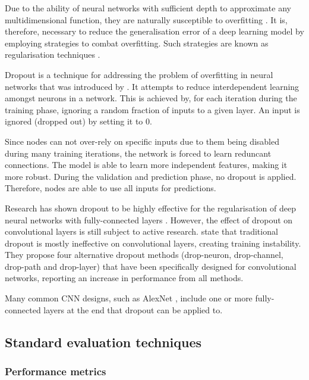 \documentclass{l4proj}
\begin{document}
Due to the ability of neural networks with sufficient depth to approximate any multidimensional function, they are naturally susceptible to overfitting \citep{tetko_neural_1995}. It is, therefore, necessary to reduce the generalisation error of a deep learning model by employing strategies to combat overfitting. Such strategies are known as regularisation techniques \citep{goodfellow_deep_2016}.

Dropout is a technique for addressing the problem of overfitting in neural networks that was introduced by \citet{srivastava_dropout_2014}. It attempts to reduce interdependent learning amongst neurons in a network. This is achieved by, for each iteration during the training phase, ignoring a random fraction of inputs to a given layer. An input is ignored (dropped out) by setting it to 0.

Since nodes can not over-rely on specific inputs due to them being disabled during many training iterations, the network is forced to learn reduncant connections. The model is able to learn more independent features, making it more robust. During the validation and prediction phase, no dropout is applied. Therefore, nodes are able to use all inputs for predictions.

Research has shown dropout to be highly effective for the regularisation of deep neural networks with fully-connected layers \citep{wu_towards_2015}. However, the effect of dropout on convolutional layers is still subject to active research. \citet{cai_effective_2019} state that traditional dropout is mostly ineffective on convolutional layers, creating training instability. They propose four alternative dropout methods (drop-neuron, drop-channel, drop-path and drop-layer) that have been specifically designed for convolutional networks, reporting an increase in performance from all methods. 

Many common CNN designs, such as AlexNet \citep{krizhevsky_imagenet_2012}, include one or more fully-connected layers at the end that dropout can be applied to. 

\subsection{Standard evaluation techniques}

\subsubsection{Performance metrics}
\end{document}
